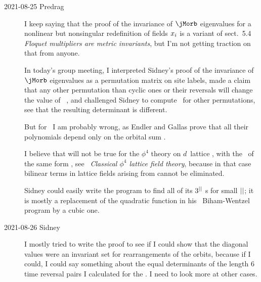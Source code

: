 \begin{description}
\item[2021-08-25 Predrag]
I keep saying that the proof of the invariance of {\jacobianOrb} $\jMorb$
eigenvalues for a nonlinear but nonsingular redefinition of fields
$x_i$ is a variant of  {sect.~5.4} {\em
Floquet multipliers are metric invariants}, but I'm not getting traction
on that from anyone.

In today's group meeting, I interpreted Sidney's proof of the invariance
of {\jacobianOrb} $\jMorb$ eigenvalues  as a
permutation matrix on site labels, made a claim that any other
permutation than \Dn{\cl{}} cyclic ones or their reversals will change
the value of \henlatt\ \HillDet, and challenged Sidney to compute
\HillDet\ for other permutations, see that the resulting determinant is
different.

But for \henlatt\ I am probably wrong, as Endler and Gallas
prove that all their polynomials depend only on the orbital sum
.

I believe that will not be true for the {$\phi^4$} theory
 on $d$\dmn\ lattice , with the
\HillDet\  of the same form , see
~{\em Classical {$\phi^4$} lattice field theory},
because in that case bilinear terms in lattice fields arising from
 cannot be eliminated.

Sidney could easily write the program to find all of its $3^{||}$
{\lattstate}s for small ${||}$; it is mostly a replacement of the
quadratic function in his \henlatt\ Biham-Wentzel program by a cubic
one.

\item[2021-08-26 Sidney]
I mostly tried to write the proof to see if I could show that the
diagonal values were an invariant set for rearrangements of the orbits,
because if I could, I could say something about  the equal determinants
of the length 6 time reversal pairs I calculated for the {\henlatt}. I need to
look more at other cases.


\end{description}
